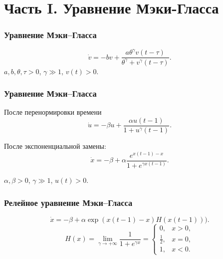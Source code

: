 \section{Часть I. Уравнение Мэки-Гласса}

\begin{frame}
	\frametitle{Уравнение Мэки--Гласса}
	\begin{equation*}
		\label{eq:MG}
		\dot{v}=-b v+\frac{a \theta^{\gamma} v(t-\tau)}{\theta^{\gamma}+v^{\gamma}(t-\tau)}.
	\end{equation*}
	$a, b, \theta, \tau > 0$, $\gamma \gg 1$, $v(t) > 0$.
\end{frame}

\vspace{2em}

\begin{frame}
	\frametitle{Уравнение Мэки--Гласса}
	После перенормировки времени
	\begin{equation*}
		\label{eq:MG_norm}
		\dot{u}=-\beta u + \frac{\alpha u(t - 1)}{1 + u^{\gamma}(t - 1)}.
	\end{equation*}
	
	После экспоненциальной замены:
	\begin{equation}
		\label{eq:MG_x}
		\dot{x}=-\beta+\alpha\frac{e^{x(t-1)-x}}{1 + e^{\gamma x(t-1)}}.
	\end{equation}
	
	$\alpha, \beta > 0$, $\gamma \gg 1$, $u(t) > 0$.
\end{frame}

\begin{frame}
	\frametitle{Релейное уравнение Мэки--Гласса}
	\begin{equation}
		\label{eq:MG_rele}
		\dot{x}=-\beta + \alpha \exp({x(t-1)-x})H(x(t-1))).
	\end{equation}
	\begin{equation}
		\label{eq:H}
		H(x)=\lim\limits_{\gamma\to +\infty}\frac{1}{1 + e^{\gamma x}}=
		\begin{cases}
			0, & x > 0,\\
			\frac{1}{2}, & x = 0,\\
			1, & x < 0.
		\end{cases}
	\end{equation}
\end{frame}

